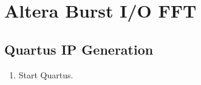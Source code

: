 \section{Altera Burst I/O FFT}
\label{sec:burst_fft}

\subsection{Quartus IP Generation}

\begin{enumerate}
\item Start Quartus.


\end{enumerate}
